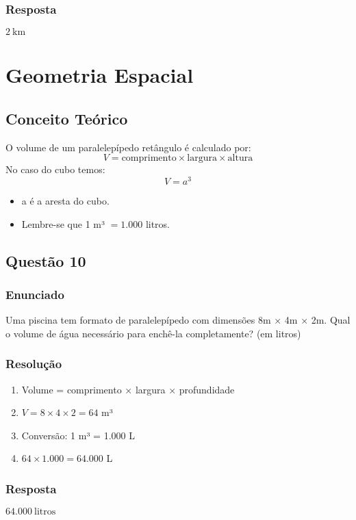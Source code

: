 \documentclass[11pt]{article}
\begin{document}
\subsubsection*{Resposta}
$\boxed{2\ \text{km}}$

\section{Geometria Espacial}

\subsection{Conceito Teórico}
O volume de um paralelepípedo retângulo é calculado por:
\[ V = \text{comprimento} \times \text{largura} \times \text{altura} \]
No caso do cubo temos: 
\[V = a^{3} \]

\begin{itemize}
    \item a é a aresta do cubo.
    \item  Lembre-se que 1 m³ $ = 1.000$  litros.
\end{itemize}


\subsection{Questão 10}
\subsubsection*{Enunciado}
Uma piscina tem formato de paralelepípedo com dimensões 8m × 4m × 2m. Qual o volume de água necessário para enchê-la completamente? (em litros)

\subsubsection*{Resolução}
\begin{enumerate}
\item Volume = comprimento × largura × profundidade
\item $V = 8 \times 4 \times 2 = 64$ m³
\item Conversão: 1 m³ = 1.000 L
\item $64 \times 1.000 = 64.000$ L
\end{enumerate}

\subsubsection*{Resposta}
$\boxed{64.000\ \text{litros}}$
\end{document}
